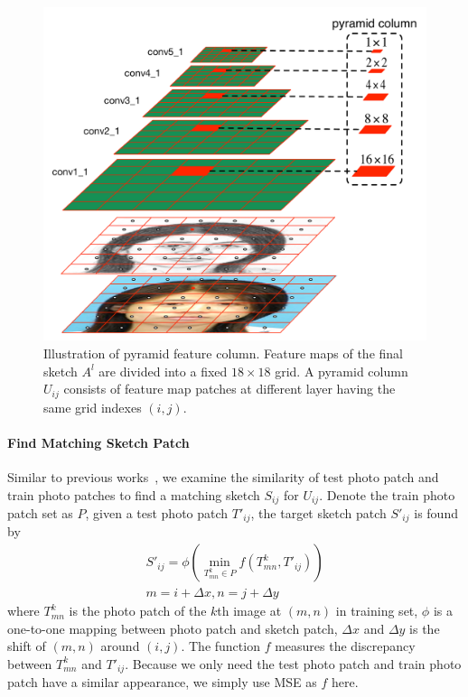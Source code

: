 \documentclass[10pt,twocolumn,letterpaper]{article}
\begin{document}
\begin{figure}[htbp]
\centering
\includegraphics[width=0.85\linewidth]{img/pyramidcolumn.pdf}
\caption{Illustration of pyramid feature column. Feature maps of the final sketch $A^{l}$ are divided into a fixed $18\times18$ grid. A pyramid column $U_{ij}$ consists of feature map patches at different layer having the same grid indexes $(i, j)$.}
\label{fig:pyramidcolumn}
\end{figure}

\paragraph*{Find Matching Sketch Patch} Similar to previous works~\cite{wang2009face,zhou2012markov}, we examine the similarity of test photo patch and train photo patches to find a matching sketch $S_{ij}$ for $U_{ij}$. Denote the train photo patch set as $P$, given a test photo patch $T'_{ij}$, the target sketch patch $S'_{ij}$ is found by
\begin{gather}
S'_{ij} = \phi(\min_{T^k_{mn} \in P} f(T^k_{mn}, T'_{ij})) \\
m = i + \Delta x, n = j + \Delta y
\end{gather}
where $T^k_{mn}$ is the photo patch of the $k$th image at $(m, n)$ in training set, $\phi$ is a one-to-one mapping between photo patch and sketch patch, $\Delta x$ and $\Delta y$ is the shift of $(m, n)$ around $(i, j)$. The function $f$ measures the discrepancy between $T^k_{mn}$ and $T'_{ij}$. Because we only need the test photo patch and train photo patch have a similar appearance, we simply use MSE as $f$ here.
\end{document}
